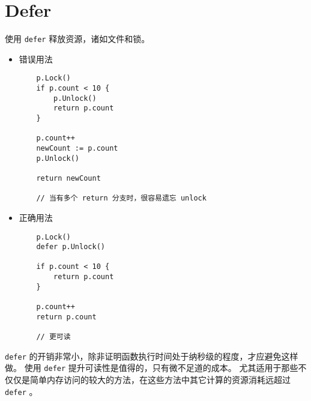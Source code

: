 \chapter{Defer}
使用 \texttt{defer} 释放资源，诸如文件和锁。
\begin{itemize}[leftmargin=4em]
\item 错误用法

  \begin{verbatim}
    p.Lock()
    if p.count < 10 {
    	p.Unlock()
    	return p.count
    }

    p.count++
    newCount := p.count
    p.Unlock()

    return newCount

    // 当有多个 return 分支时，很容易遗忘 unlock
  \end{verbatim}
\item 正确用法

  \begin{verbatim}
    p.Lock()
    defer p.Unlock()

    if p.count < 10 {
    	return p.count
    }

    p.count++
    return p.count

    // 更可读
  \end{verbatim}
\end{itemize}

\texttt{defer} 的开销非常小，除非证明函数执行时间处于纳秒级的程度，才应避免这样做。
使用 \texttt{defer} 提升可读性是值得的，只有微不足道的成本。
尤其适用于那些不仅仅是简单内存访问的较大的方法，在这些方法中其它计算的资源消耗远超过 \texttt{defer} 。
